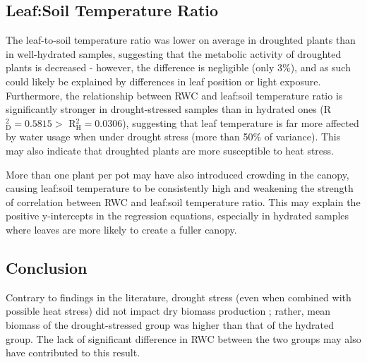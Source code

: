 \documentclass{report}
\begin{document}
\subsection*{Leaf:Soil Temperature Ratio}

\hspace{24pt}The leaf-to-soil temperature ratio was lower on average in droughted plants than in well-hydrated samples, suggesting that the metabolic activity of droughted plants is decreased - however, the difference is negligible (only 3\%), and as such could likely be explained by differences in leaf position or light exposure. Furthermore, the relationship between RWC and leaf:soil temperature ratio is significantly stronger in drought-stressed samples than in hydrated ones (R${}^{2}_{\text{D}} = 0.5815 >$ R${}^{2}_{\text{H}} = 0.0306$), suggesting that leaf temperature is far more affected by water usage when under drought stress (more than 50\% of variance). This may also indicate that droughted plants are more susceptible to heat stress.

\hspace{24pt}More than one plant per pot may have also introduced crowding in the canopy, causing leaf:soil temperature to be consistently high and weakening the strength of correlation between RWC and leaf:soil temperature ratio. This may explain the positive y-intercepts in the regression equations, especially in hydrated samples where leaves are more likely to create a fuller canopy.


\subsection*{Conclusion}

\hspace{24pt}Contrary to findings in the literature, drought stress (even when combined with possible heat stress) did not impact dry biomass production \cite{biomass}; rather, mean biomass of the drought-stressed group was higher than that of the hydrated group. The lack of significant difference in RWC between the two groups may also have contributed to this result.
\end{document}
